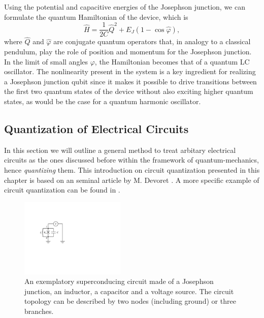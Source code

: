 Using the potential and capacitive energies of the Josephson junction, we can formulate the quantum Hamiltonian of the device, which is
%
\begin{equation}
\hat{H} = \frac{1}{2C}\hat{Q}^2+E_J(1-\cos{\hat{\varphi}}),
\end{equation}
%
where $\hat{Q}$ and $\hat{\varphi}$ are conjugate quantum operators that, in analogy to a classical pendulum, play the role of position and momentum for the Josephson junction. In the limit of small angles $\varphi$, the Hamiltonian becomes that of a quantum LC oscillator. The nonlinearity present in the system is a key ingredient for realizing a Josephson junction qubit since it makes it possible to drive transitions between the first two quantum states of the device without also exciting higher quantum states, as would be the case for a quantum harmonic oscillator.

\subsection{Quantization of Electrical Circuits}

In this section we will outline a general method to treat arbitary electrical circuits as the ones discussed before within the framework of quantum-mechanics, hence {\it quantizing} them. This introduction on circuit quantization presented in this chapter is based on an seminal article by M. Devoret \cite{devoret_quantum_1995}. A more specific example of circuit quantization can be found in \citep{burkard_multilevel_2004}.

\begin{figure}
	\includegraphics[width=5cm]{"./material/figures/introduction/sample_circuit"}
	\caption{An exemplatory superconducing circuit made of a Josephson junction, an inductor, a capacitor and a voltage source. The circuit topology can be described by two nodes (including ground) or three branches.}
	\label{fig:SampleCircuit}
\end{figure}

